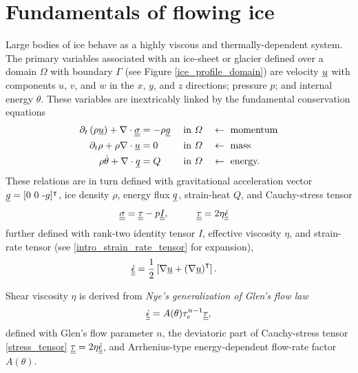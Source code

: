 
\chapter{Fundamentals of flowing ice}

Large bodies of ice behave as a highly viscous and thermally-dependent system.  The primary variables associated with an ice-sheet or glacier defined over a domain $\Omega$ with boundary $\Gamma$ (see Figure \cref{ice_profile_domain}) are velocity $\underline{u}$ with components $u$, $v$, and $w$ in the $x$, $y$, and $z$ directions; pressure $p$; and internal energy $\theta$.  These variables are inextricably linked by the fundamental conservation equations 
\begin{align}
  \label{cons_momentum}
  \partial_t \left(\rho \underline{u} \right) + \nabla \cdot \underline{\underline{\sigma}} &= -\rho\underline{g} &&\text{ in } \varOmega &&\leftarrow \text{ momentum} \\
  \label{cons_mass}
  \partial_t \rho + \rho \nabla \cdot \underline{u} &= 0 &&\text{ in } \varOmega &&\leftarrow \text{ mass}  \\
  \label{cons_energy}
  \rho \dot{\theta} + \nabla \cdot \underline{q}  &= Q &&\text{ in } \varOmega &&\leftarrow \text{ energy.}
\end{align}
These relations are in turn defined with gravitational acceleration vector $\underline{g}=[0\ 0\ \text{-}g]^\intercal$, ice density $\rho$, energy flux $\underline{q}$, strain-heat $Q$, and   Cauchy-stress tensor
\begin{align}
  \label{stress_tensor}
  \ranktwo{\sigma} &= \ranktwo{\tau} - p \ranktwo{I}, \hspace{10mm} \ranktwo{\tau} = 2\eta\ranktwo{\dot{\epsilon}}
\end{align}
further defined with rank-two identity tensor $I$, effective viscosity $\eta$, and  strain-rate tensor (see \cref{intro_strain_rate_tensor} for expansion),
\begin{align}
  \label{strain_rate_tensor}
  \underline{\underline{\dot{\epsilon}}} 
  &= \frac{1}{2} \left[ \nabla \underline{u} + \left(\nabla \underline{u} \right)^\intercal \right].
\end{align}

Shear viscosity $\eta$ is derived from  \emph{Nye's generalization of Glen's flow law} \citep{glen_1952, nye_1957} 
\begin{align}
  \label{nye}
  \underline{\underline{\dot{\epsilon}}} = A(\theta) \tau_e^{n-1} \underline{\underline{\tau}},
\end{align}
defined with Glen's flow parameter $n$, the deviatoric part of Cauchy-stress tensor \cref{stress_tensor} $\underline{\underline{\tau}} = 2\eta \underline{\underline{\dot{\epsilon}}}$, and Arrhenius-type energy-dependent flow-rate factor $A(\theta)$.

